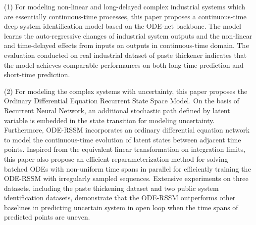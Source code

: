 (1) For modeling non-linear and long-delayed complex industrial systems which are essentially continuous-time processes, this paper proposes a continuous-time deep system identification model based on the ODE-net backbone.
The model learns the auto-regressive changes of industrial system outputs and the non-linear and time-delayed effects from inputs on outputs in continuous-time domain. 
The evaluation conducted on real industrial dataset of paste thickener indicates that the model achieves comparable performances on both long-time prediction and short-time prediction.   



(2) For modeling the complex systems with uncertainty, this paper proposes the  Ordinary Differential Equation Recurrent State Space Model. 
On the basis of Recurrent Neural Network, an additional stochastic path defined by latent variable is embedded in the state transition for modeling uncertainty.
Furthermore, ODE-RSSM incorporates an ordinary differential equation network to model the continuous-time evolution of latent states between adjacent time points.
Inspired from the equivalent linear transformation on integration limits,
this paper also propose an efficient reparameterization method for solving batched ODEs with non-uniform time spans in parallel for efficiently training the ODE-RSSM with irregularly sampled sequences.
Extensive experiments on three datasets, including the paste thickening dataset and two public system identification datasets, demonstrate that the ODE-RSSM outperforms other baselines in predicting uncertain system in open loop when the time spans of predicted points are uneven.

